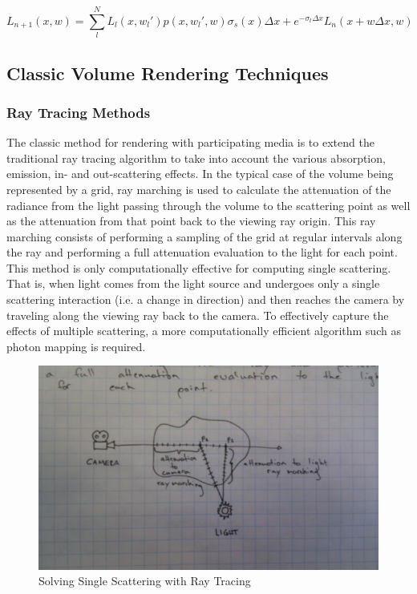 \documentclass{article}
\begin{document}
\begin{equation}
L_{n+1}(x, w) = \displaystyle\sum_{l}^{N}L_{l}(x,w_{l}')p(x,w_{l}',w)\sigma_{s}(x)\Delta x + e^{-\sigma_{t}\Delta x}L_{n}(x + w\Delta x,w)
\end{equation}

\subsection{Classic Volume Rendering Techniques}

\subsubsection{Ray Tracing Methods}

The classic method for rendering with participating media is to extend the traditional ray tracing algorithm to take into account the various absorption, emission, in- and out-scattering effects. 
\newline \newline
In the typical case of the volume being represented by a grid, ray marching is used to calculate the attenuation of the radiance from the light passing through the volume to the scattering point as well as the attenuation from that point back to the viewing ray origin.
\newline \newline
This ray marching consists of performing a sampling of the grid at regular intervals along the ray and performing a full attenuation evaluation to the light for each point.
\newline \newline
This method is only computationally effective for computing single scattering. That is, when light comes from the light source and undergoes only a single scattering interaction (i.e. a change in direction) and then reaches the camera by traveling along the viewing ray back to the camera.
\newline \newline
To effectively capture the effects of multiple scattering, a more computationally efficient algorithm such as photon mapping is required.

\begin{figure}[h!]
	\centering
	\includegraphics[scale=0.5]{Images/SingleScatteringRayTracing}
	\caption{Solving Single Scattering with Ray Tracing}
\end{figure}
\end{document}
